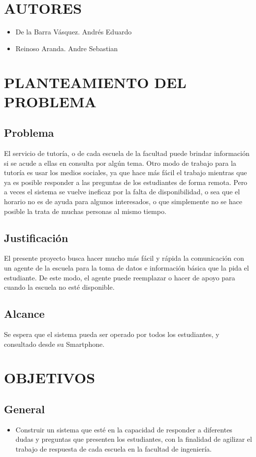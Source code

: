 \documentclass[12pt,letterpaper]{article}
\begin{document}
\section{AUTORES}

\begin{itemize}
	\item De la Barra Vásquez. Andrés Eduardo
	\item Reinoso Aranda. Andre Sebastian
	
\end{itemize}

\section{PLANTEAMIENTO DEL PROBLEMA}
	\subsection{Problema}
El servicio de tutoría, o de cada escuela de la facultad puede brindar información si se acude a ellas en consulta por algún tema. Otro modo de trabajo para la tutoría es usar los medios sociales, ya que hace más fácil el trabajo mientras que ya es posible responder a las preguntas de los estudiantes de forma remota. Pero a veces el sistema se vuelve ineficaz por la falta de disponibilidad, o sea que el horario no es de ayuda para algunos interesados, o que simplemente no se hace posible la trata de muchas personas al mismo tiempo.\\
	\subsection{Justificación}
El presente proyecto busca hacer mucho más fácil y rápida la comunicación con un agente de la escuela para la toma de datos e información básica que la pida el estudiante. De este modo, el agente puede reemplazar o hacer de apoyo para cuando la escuela no esté disponible.
	\subsection{Alcance}
Se espera que el sistema pueda ser operado por todos los estudiantes, y consultado desde su Smartphone.

\section{OBJETIVOS}
	\subsection{General}
\begin{itemize}
	\item Construir un sistema que esté en la capacidad de responder a diferentes dudas y preguntas que presenten los estudiantes, con la finalidad de agilizar el trabajo de respuesta de cada escuela en la facultad de ingeniería.
\end{itemize}
\end{document}

